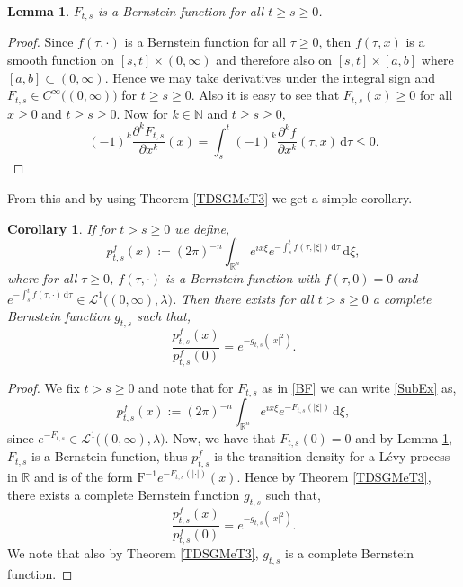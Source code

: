 \documentclass[a4paper, 12pt]{report}
\newtheorem{lemma}[theorem]{Lemma}
\newtheorem{corollary}[theorem]{Corollary}
\theoremstyle{remark}
\theoremstyle{definition}
\begin{document}
\begin{lemma}\label{TDSGMeL1}
$F_{t, s}$ is a Bernstein function for all $t \ge s \ge 0$.
\end{lemma}
\begin{proof}
Since $f(\tau, \cdot)$ is a Bernstein function for all $\tau \ge 0$, then $f(\tau, x)$ is a smooth function on $[s, t] \times (0, \infty)$ and therefore also on $[s, t] \times [a, b]$ where $[a, b] \subset (0, \infty)$.  Hence we may take derivatives under the integral sign and $F_{t, s} \in C^\infty\big((0, \infty)\big)$ for $t \ge s \ge 0$.  Also it is easy to see that $F_{t, s}(x) \ge 0$ for all $x \ge 0$ and $t \ge s \ge 0$.  Now for $k \in \mathbb{N}$ and $t \ge s \ge 0$,
$$
(-1)^k\frac{\partial^kF_{t, s}}{\partial x^k}(x) = \int_s^t(-1)^k\frac{\partial^kf}{\partial x^k}(\tau, x)\,\mathrm{d}\tau \le 0.
$$
\end{proof}

From this and by using Theorem \ref{TDSGMeT3} we get a simple corollary.
\begin{corollary}\label{TDSGMetcC1}
If for $t > s \ge 0$ we define,
\begin{equation}
p_{t, s}^f(x) := (2\pi)^{-n}\int_{\mathbb{R}^n}e^{ix\xi}e^{-\int_s^tf(\tau, |\xi|)\,\mathrm{d}\tau}\,\mathrm{d}\xi,\label{SubEx}
\end{equation}
where for all $\tau \ge 0$, $f(\tau, \cdot)$ is a Bernstein function with $f(\tau, 0) = 0$ and $e^{-\int_s^tf(\tau, \cdot)\,\mathrm{d}\tau} \in \mathcal{L}^1\big((0, \infty), \lambda\big)$.  Then there exists for all $t > s \ge 0$ a complete Bernstein function $g_{t, s}$ such that,
$$
\frac{p_{t, s}^f(x)}{p_{t, s}^f(0)} = e^{-g_{t, s}(|x|^2)}.
$$
\end{corollary}
\begin{proof}
We fix $t > s \ge 0$ and note that for $F_{t, s}$ as in \eqref{BF} we can write \eqref{SubEx} as,
$$
p_{t, s}^f(x) := (2\pi)^{-n}\int_{\mathbb{R}^n}e^{ix\xi}e^{-F_{t, s}(|\xi|)}\,\mathrm{d}\xi,
$$
since $e^{-F_{t, s}} \in \mathcal{L}^1\big((0, \infty), \lambda\big)$.  Now, we have that $F_{t, s}(0) = 0$ and by Lemma \ref{TDSGMeL1}, $F_{t, s}$ is a Bernstein function, thus $p_{t, s}^f$ is the transition density for a L\'evy process in $\mathbb{R}$ and is of the form $\mathrm{F}^{-1}e^{-F_{t, s}(|\cdot|)}(x)$.  Hence by Theorem \ref{TDSGMeT3}, there exists a complete Bernstein function $g_{t, s}$ such that,
$$
\frac{p_{t, s}^f(x)}{p_{t, s}^f(0)} = e^{-g_{t, s}(|x|^2)}.
$$
We note that also by Theorem \ref{TDSGMeT3}, $g_{t, s}$ is a complete Bernstein function.
\end{proof}
\end{document}
